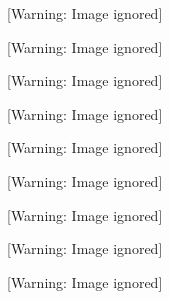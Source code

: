 \documentclass{article}
\begin{document}
\begin{center}
 [Warning: Image ignored] %

\end{center}
\begin{center}
 [Warning: Image ignored] %

\end{center}
\begin{center}
 [Warning: Image ignored] %

\end{center}
\begin{center}
 [Warning: Image ignored] %

\end{center}
\begin{center}
 [Warning: Image ignored] %

\end{center}
\begin{center}
 [Warning: Image ignored] %

\end{center}
\begin{center}
 [Warning: Image ignored] %

\end{center}
\begin{center}
 [Warning: Image ignored] %

\end{center}
\begin{center}
 [Warning: Image ignored] %

\end{center}
\end{document}
